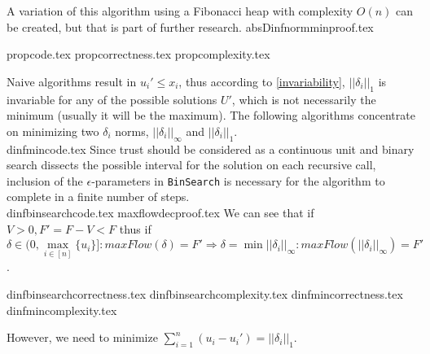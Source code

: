\documentclass[11pt]{llncs}
\begin{document}
  A variation of this algorithm using a Fibonacci heap with complexity $O(n)$ can be created, but that is part of
  further research.
  {absDinfnormminproof.tex}

  {propcode.tex}
  {propcorrectness.tex}
  {propcomplexity.tex}

  Naive algorithms result in $u_i' \leq x_i$, thus according to \ref{invariability}, $||\delta_i||_1$ is invariable for
  any of the possible solutions $U'$, which is not necessarily the minimum (usually it will be the maximum). The following
  algorithms concentrate on minimizing two $\delta_i$ norms, $||\delta_i||_\infty$ and $||\delta_i||_1$. \\
  {dinfmincode.tex}
  Since trust should be considered as a continuous unit and binary search dissects the possible interval for the solution
  on each recursive call, inclusion of the $\epsilon$-parameters in \texttt{BinSearch} is necessary for the algorithm to
  complete in a finite number of steps. \\
  {dinfbinsearchcode.tex}
  {maxflowdecproof.tex}
  We can see that if $V > 0, F' = F - V < F$ thus if $\delta \in (0, \max\limits_{i \in [n]}\{u_i\}]:
  maxFlow(\delta)= F' \Rightarrow \delta = \min||\delta_i||_\infty : maxFlow(||\delta_i||_\infty) = F'$.

  {dinfbinsearchcorrectness.tex}
  {dinfbinsearchcomplexity.tex}
  {dinfmincorrectness.tex}
  {dinfmincomplexity.tex}

  However, we need to minimize $\sum\limits_{i=1}^{n}(u_i-u_i') = ||\delta_i||_1$.
\end{document}
